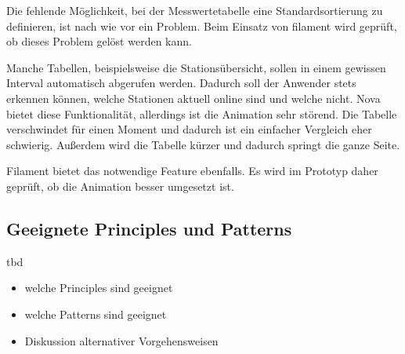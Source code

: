Die fehlende Möglichkeit, bei der Messwertetabelle eine Standardsortierung zu definieren, ist nach wie vor ein Problem.
Beim Einsatz von filament wird geprüft, ob dieses Problem gelöst werden kann.

Manche Tabellen, beispielsweise die Stationsübersicht, sollen in einem gewissen Interval automatisch abgerufen werden.
Dadurch soll der Anwender stets erkennen können, welche Stationen aktuell online sind und welche nicht.
Nova bietet diese Funktionalität, allerdings ist die Animation sehr störend.
Die Tabelle verschwindet für einen Moment und dadurch ist ein einfacher Vergleich eher schwierig.
Außerdem wird die Tabelle kürzer und dadurch springt die ganze Seite.

Filament bietet das notwendige Feature ebenfalls.
Es wird im Prototyp daher geprüft, ob die Animation besser umgesetzt ist.

\subsection{Geeignete Principles und Patterns}
tbd
\begin{itemize}
    \item welche Principles sind geeignet
    \item welche Patterns sind geeignet
    \item Diskussion alternativer Vorgehensweisen
\end{itemize}
